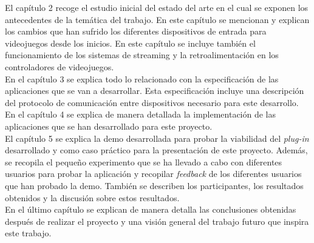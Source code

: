 El cap\'itulo 2 recoge el estudio inicial del estado del arte en el cual se exponen los antecedentes de la tem\'atica del trabajo. En este cap\'itulo se mencionan y explican los cambios que han sufrido los diferentes dispositivos de entrada para videojuegos desde los inicios. En este cap\'itulo se incluye tambi\'en el funcionamiento de los sistemas de streaming y la retroalimentaci\'on en los controladores de videojuegos.\\

En el cap\'itulo 3 se explica todo lo relacionado con la especificaci\'on de las aplicaciones que se van a desarrollar. Esta especificaci\'on incluye una descripci\'on del protocolo de comunicaci\'on entre dispositivos necesario para este desarrollo.\\

En el cap\'itulo 4 se explica de manera detallada la implementaci\'on de las aplicaciones que se han desarrollado para este proyecto.\\

El cap\'itulo 5 se explica la demo desarrollada para probar la viabilidad del \textit{plug-in} desarrollado y como caso pr\'actico para la presentaci\'on de este proyecto. Adem\'as, se recopila el peque\~no experimento que se ha llevado a cabo con diferentes usuarios para probar la aplicaci\'on y recopilar \textit{feedback} de los diferentes usuarios que han probado la demo. Tambi\'en se describen los participantes, los resultados obtenidos y la discusi\'on sobre estos resultados.\\

En el \'ultimo cap\'itulo se explican de manera detalla las conclusiones obtenidas despu\'es de realizar el proyecto y una visi\'on general del trabajo futuro que inspira este trabajo.






